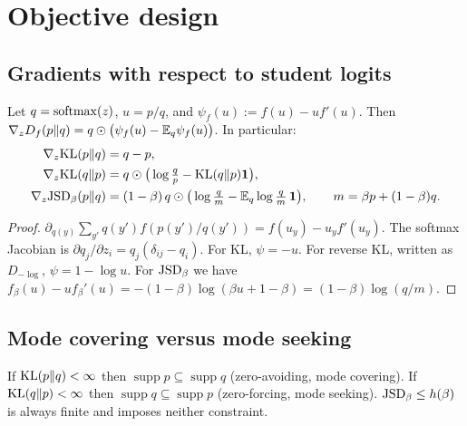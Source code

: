 \section{Objective design}\label{sec:objectives}

\subsection{Gradients with respect to student logits}

\begin{proposition}\label{prop:grad}
\Pv\Ck Let $q=\operatorname{softmax}(z)$, $u=p/q$, and $\psi_f(u):=f(u)-uf'(u)$. Then
$\nabla_zD_f(p\|q)=q\odot\big(\psi_f(u)-\mathbb{E}_q\psi_f(u)\big)$. In particular:
\begin{align*}
\nabla_z\mathrm{KL}(p\|q)&=q-p,\\
\nabla_z\mathrm{KL}(q\|p)&=q\odot\big(\log\tfrac qp-\mathrm{KL}(q\|p)\mathbf{1}\big),\\
\nabla_z\mathrm{JSD}_\beta(p\|q)&=(1-\beta)\,q\odot\big(\log\tfrac qm-\mathbb{E}_q\log\tfrac qm\,\mathbf{1}\big),\qquad m=\beta p+(1-\beta)q.
\end{align*}
\end{proposition}
\begin{proof}
$\partial_{q(y)}\sum_{y'}q(y')f(p(y')/q(y'))=f(u_y)-u_yf'(u_y)$. The softmax Jacobian is
$\partial q_j/\partial z_i=q_j(\delta_{ij}-q_i)$. For KL, $\psi=-u$. For reverse KL, written as $D_{-\log}$,
$\psi=1-\log u$. For $\mathrm{JSD}_\beta$ we have $f_\beta(u)-uf_\beta'(u)=-(1-\beta)\log(\beta u+1-\beta)=(1-\beta)\log(q/m)$.
\end{proof}

\subsection{Mode covering versus mode seeking}

\begin{proposition}\label{prop:support}
\Pv If $\mathrm{KL}(p\|q)<\infty$ then $\operatorname{supp}p\subseteq\operatorname{supp}q$ (zero-avoiding, mode covering). If
$\mathrm{KL}(q\|p)<\infty$ then $\operatorname{supp}q\subseteq\operatorname{supp}p$ (zero-forcing, mode seeking).
$\mathrm{JSD}_\beta\le h(\beta)$ is always finite and imposes neither constraint.
\end{proposition}

